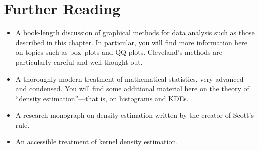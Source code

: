% 
% 
% 
% 
  


\vspace*{-9pt}
\section{Further Reading}

\begin{itemize}
\item {}
  A book-length discussion of graphical methods for data analysis such
  as those described in this chapter. In particular,\vadjust{\pagebreak} you will find
  more information here on topics such as box~plots and QQ plots.
  Cleveland's methods are particularly careful and well thought-out.

\item {}
  A thoroughly modern treatment of mathematical statistics, very 
  advanced and condensed. You will find some additional material 
  here on the theory of ``density estimation''---that is, on histograms
  and KDEs.

\item {}
  A research monograph on density estimation written by the creator of
  Scott's rule.

\item {}
  An accessible treatment of kernel density estimation.
\end{itemize}

